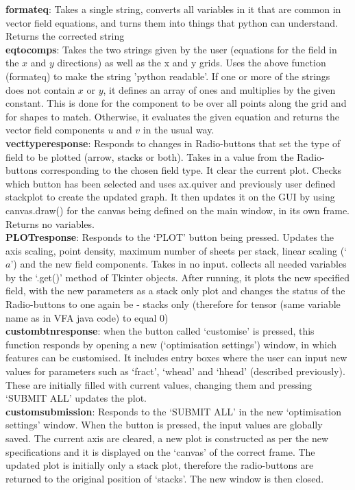 \documentclass[11]{report}
\begin{document}
\textbf{format\textunderscore eq}: Takes a single string, converts all variables in it that are common in vector field equations, and turns them into things that python can understand. Returns the corrected string\\
\textbf{eq\textunderscore to\textunderscore comps}: Takes the two strings given by the user (equations for the field in the $x$ and $y$ directions) as well as the x and y grids. Uses the above function (format\textunderscore eq) to make the string 'python readable'. If one or more of the strings does not contain $x$ or $y$, it defines an array of ones and multiplies by the given constant. This is done for the component to be over all points along the grid and for shapes to match. Otherwise, it evaluates the given equation and returns the vector field components $u$ and $v$ in the usual way.\\
\textbf{vect\textunderscore type\textunderscore response}: Responds to changes in Radio-buttons that set the type of field to be plotted (arrow, stacks or both). Takes in a value from the Radio-buttons corresponding to the chosen field type. It clear the current plot. Checks which button has been selected and uses ax.quiver and previously user defined stack\textunderscore plot to create the updated graph. It then updates it on the GUI by using canvas.draw() for the canvas being defined on the main window, in its own frame. Returns no variables.\\
\textbf{PLOT\textunderscore response}: Responds to the `PLOT' button being pressed. Updates the axis scaling, point density, maximum number of sheets per stack, linear scaling (`$a$') and the new field components. Takes in no input. collects all needed variables by the `.get()' method of Tkinter objects. After running, it plots the new specified field, with the new parameters as a stack only plot and changes the status of the Radio-buttons to one again be - stacks only (therefore for tensor (same variable name as in VFA java code) to equal 0)\\
\textbf{custom\textunderscore btn\textunderscore response}: when the button called `customise' is pressed, this function responds by opening a new (`optimisation settings') window, in which features can be customised. It includes entry boxes where the user can input new values for parameters such as `fract', `w\textunderscore head' and `h\textunderscore head' (described previously). These are initially filled with current values, changing them and pressing `SUBMIT ALL' updates the plot.\\
\textbf{custom\textunderscore submission}: Responds to the `SUBMIT ALL' in the new `optimisation settings' window. When the button is pressed, the input values are globally saved. The current axis are cleared, a new plot is constructed as per the new specifications and it is displayed on the `canvas' of the correct frame. The updated plot is initially only a stack plot, therefore the radio-buttons are returned to the original position of `stacks'. The new window is then closed.
\end{document}
